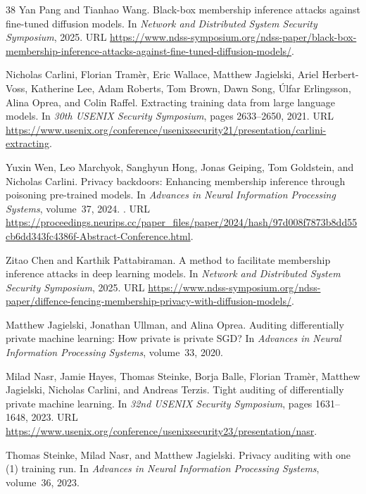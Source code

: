 \begin{thebibliography}{38}
Yan Pang and Tianhao Wang.
\newblock Black-box membership inference attacks against fine-tuned diffusion
  models.
\newblock In \emph{Network and Distributed System Security Symposium}, 2025.
\newblock URL
  \url{https://www.ndss-symposium.org/ndss-paper/black-box-membership-inference-attacks-against-fine-tuned-diffusion-models/}.

Nicholas Carlini, Florian Tram{\`e}r, Eric Wallace, Matthew Jagielski, Ariel
  Herbert-Voss, Katherine Lee, Adam Roberts, Tom Brown, Dawn Song, {\'U}lfar
  Erlingsson, Alina Oprea, and Colin Raffel.
\newblock Extracting training data from large language models.
\newblock In \emph{30th USENIX Security Symposium}, pages 2633--2650, 2021.
\newblock URL
  \url{https://www.usenix.org/conference/usenixsecurity21/presentation/carlini-extracting}.

Yuxin Wen, Leo Marchyok, Sanghyun Hong, Jonas Geiping, Tom Goldstein, and
  Nicholas Carlini.
\newblock Privacy backdoors: Enhancing membership inference through poisoning
  pre-trained models.
\newblock In \emph{Advances in Neural Information Processing Systems},
  volume~37, 2024.
\newblock {}.
\newblock URL
  \url{https://proceedings.neurips.cc/paper_files/paper/2024/hash/97d008f7873b8dd55cb6dd343fc4386f-Abstract-Conference.html}.

Zitao Chen and Karthik Pattabiraman.
\newblock A method to facilitate membership inference attacks in deep learning
  models.
\newblock In \emph{Network and Distributed System Security Symposium}, 2025.
\newblock URL
  \url{https://www.ndss-symposium.org/ndss-paper/diffence-fencing-membership-privacy-with-diffusion-models/}.

Matthew Jagielski, Jonathan Ullman, and Alina Oprea.
\newblock Auditing differentially private machine learning: How private is
  private {SGD}?
\newblock In \emph{Advances in Neural Information Processing Systems},
  volume~33, 2020.

Milad Nasr, Jamie Hayes, Thomas Steinke, Borja Balle, Florian Tram{\`e}r,
  Matthew Jagielski, Nicholas Carlini, and Andreas Terzis.
\newblock Tight auditing of differentially private machine learning.
\newblock In \emph{32nd USENIX Security Symposium}, pages 1631--1648, 2023.
\newblock URL
  \url{https://www.usenix.org/conference/usenixsecurity23/presentation/nasr}.

Thomas Steinke, Milad Nasr, and Matthew Jagielski.
\newblock Privacy auditing with one (1) training run.
\newblock In \emph{Advances in Neural Information Processing Systems},
  volume~36, 2023.


\end{thebibliography}

